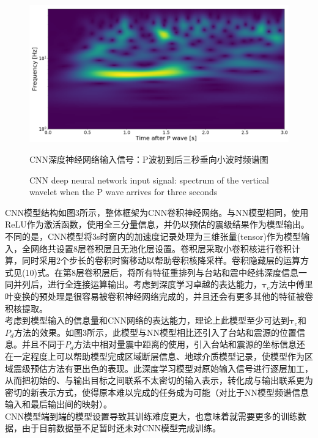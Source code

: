 \begin{figure}[h] 
\centering 
 \includegraphics[width=0.99\linewidth]{img/wavelet.jpg} 
 \renewcommand{\figurename}{图} 
\caption{CNN深度神经网络输入信号：P波初到后三秒垂向小波时频谱图} 
\addtocounter{figure}{-1} \vspace{-5pt} 
\renewcommand{\figurename}{Fig} 
\caption{CNN deep neural network input signal: spectrum of the vertical wavelet when the P wave arrives for three seconds} 
\renewcommand{\figurename}{图} 
\label{fig:network-device-influence.png} 
\end{figure}
\indent CNN模型结构如图3所示，整体框架为CNN卷积神经网络。与NN模型相同，使用ReLU作为激活函数，使用全三分量信息，并仍以预估的震级结果作为模型输出。不同的是，CNN模型将3s时窗内的加速度记录处理为三维张量(tensor)作为模型输入，全网络共设置8层卷积层且无池化层设置。卷积层采取小卷积核进行卷积计算，同时采用2个步长的卷积时窗移动以帮助卷积核降采样。卷积隐藏层的运算方式见(10)式。在第8层卷积层后，将所有特征重排列与台站和震中经纬深度信息一同并列后，进行全连接运算输出。考虑到深度学习卓越的表达能力，$\mathbf{\tau}_{\mathrm{c}}$方法中傅里叶变换的预处理是很容易被卷积神经网络完成的，并且还会有更多其他的特征被卷积核提取。\\
\indent 考虑到模型输入的信息量和CNN网络的表达能力，理论上此模型至少可达到$\mathbf{\tau}_{\mathrm{c}}$和$P_{d}$方法的效果。如图3所示，此模型与NN模型相比还引入了台站和震源的位置信息。并且不同于$P_{d}$方法中相对量震中距离的使用，引入台站和震源的坐标信息还在一定程度上可以帮助模型完成区域断层信息、地球介质模型记录，使模型作为区域震级预估方法有更出色的表现。此深度学习模型对原始输入信号进行逐层加工，从而把初始的、与输出目标之间联系不太密切的输入表示，转化成与输出联系更为密切的新表示方式，使得原本难以完成的任务成为可能（对比于NN模型频谱信息输入和最后输出间的映射）。\\
\indent CNN模型端到端的模型设置导致其训练难度更大，也意味着就需要更多的训练数据，由于目前数据量不足暂时还未对CNN模型完成训练。\\

